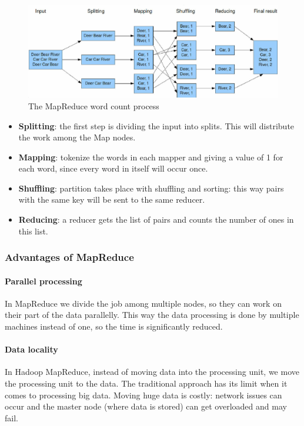 \begin{figure}[H]
	\includegraphics[width=150mm, keepaspectratio]{figures/MapReduce_Example.png}
	\caption*{The MapReduce word count process \cite{MapReduce-example-figure}}
	\centering
\end{figure}
\begin{itemize}
	\item \textbf{Splitting}: the first step is dividing the input into splits. This will distribute the work among the Map nodes.
	\item \textbf{Mapping}: tokenize the words in each mapper and giving a value of 1 for each word, since every word in itself will occur once.
	\item \textbf{Shuffling}: partition takes place with shuffling and sorting: this way pairs with the same key will be sent to the same reducer.
	\item \textbf{Reducing}: a reducer gets the list of pairs and counts the number of ones in this list.
\end{itemize}

\subsubsection*{Advantages of MapReduce \cite{MapReduce-example}}
\paragraph{Parallel processing}
In MapReduce we divide the job among multiple nodes, so they can work on their part of the data parallelly. This way the data processing is done by multiple machines instead of one, so the time is significantly reduced.
\paragraph{Data locality}
In Hadoop MapReduce, instead of moving data into the processing unit, we move the processing unit to the data. The traditional approach has its limit when it comes to processing big data. Moving huge data is costly: network issues can occur and the master node (where data is stored) can get overloaded and may fail. 


